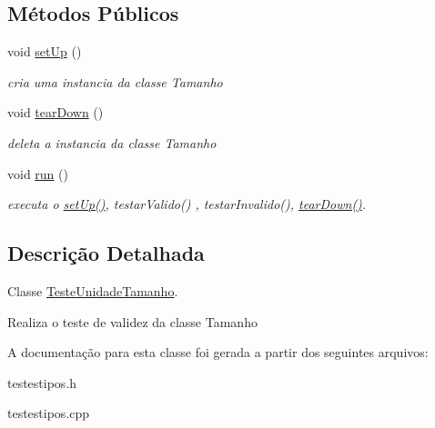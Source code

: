 \subsection*{\-Métodos \-Públicos}
\begin{DoxyCompactItemize}
\item 
\hypertarget{class_teste_unidade_tamanho_aadca7a2934b8832990a48cbe55ee832b}{
void \hyperlink{class_teste_unidade_tamanho_aadca7a2934b8832990a48cbe55ee832b}{set\-Up} ()}
\label{class_teste_unidade_tamanho_aadca7a2934b8832990a48cbe55ee832b}

\begin{DoxyCompactList}\small\item\em cria uma instancia da classe \-Tamanho \end{DoxyCompactList}\item 
\hypertarget{class_teste_unidade_tamanho_a63cadec089bb5bc16dc9978084260fc8}{
void \hyperlink{class_teste_unidade_tamanho_a63cadec089bb5bc16dc9978084260fc8}{tear\-Down} ()}
\label{class_teste_unidade_tamanho_a63cadec089bb5bc16dc9978084260fc8}

\begin{DoxyCompactList}\small\item\em deleta a instancia da classe \-Tamanho \end{DoxyCompactList}\item 
\hypertarget{class_teste_unidade_tamanho_af9bb3a26b5efeafd92798e2eefd91151}{
void \hyperlink{class_teste_unidade_tamanho_af9bb3a26b5efeafd92798e2eefd91151}{run} ()}
\label{class_teste_unidade_tamanho_af9bb3a26b5efeafd92798e2eefd91151}

\begin{DoxyCompactList}\small\item\em executa o \hyperlink{class_teste_unidade_tamanho_aadca7a2934b8832990a48cbe55ee832b}{set\-Up()}, testar\-Valido() , testar\-Invalido(), \hyperlink{class_teste_unidade_tamanho_a63cadec089bb5bc16dc9978084260fc8}{tear\-Down()}. \end{DoxyCompactList}\end{DoxyCompactItemize}


\subsection{\-Descrição \-Detalhada}
\-Classe \hyperlink{class_teste_unidade_tamanho}{\-Teste\-Unidade\-Tamanho}. 

\-Realiza o teste de validez da classe \-Tamanho 

\-A documentação para esta classe foi gerada a partir dos seguintes arquivos\-:\begin{DoxyCompactItemize}
\item 
testestipos.\-h\item 
testestipos.\-cpp\end{DoxyCompactItemize}
